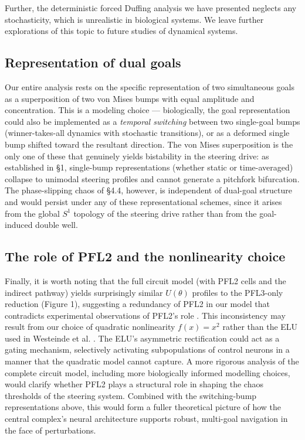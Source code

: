 \documentclass[11pt]{article}
\begin{document}
Further, the deterministic forced Duffing analysis we have presented neglects any stochasticity, which is unrealistic in biological systems. We leave further explorations of this topic to future studies of dynamical systems.

\subsection{Representation of dual goals}

Our entire analysis rests on the specific representation of two simultaneous goals as a superposition of two von Mises bumps with equal amplitude and concentration. This is a modeling choice --- biologically, the goal representation could also be implemented as a \textit{temporal switching} between two single-goal bumps (winner-takes-all dynamics with stochastic transitions), or as a deformed single bump shifted toward the resultant direction. The von Mises superposition is the only one of these that genuinely yields bistability in the steering drive: as established in §1, single-bump representations (whether static or time-averaged) collapse to unimodal steering profiles and cannot generate a pitchfork bifurcation. The phase-slipping chaos of §4.4, however, is independent of dual-goal structure and would persist under any of these representational schemes, since it arises from the global $S^1$ topology of the steering drive rather than from the goal-induced double well.

\subsection{The role of PFL2 and the nonlinearity choice}

Finally, it is worth noting that the full circuit model (with PFL2 cells and the indirect pathway) yields surprisingly similar $U(\theta)$ profiles to the PFL3-only reduction (Figure 1), suggesting a redundancy of PFL2 in our model that contradicts experimental observations of PFL2's role \cite{westeinde2024}. This inconsistency may result from our choice of quadratic nonlinearity $f(x) = x^2$ rather than the ELU used in Westeinde et al. \cite{westeinde2024}. The ELU's asymmetric rectification could act as a gating mechanism, selectively activating subpopulations of control neurons in a manner that the quadratic model cannot capture. A more rigorous analysis of the complete circuit model, including more biologically informed modelling choices, would clarify whether PFL2 plays a structural role in shaping the chaos thresholds of the steering system. Combined with the switching-bump representations above, this would form a fuller theoretical picture of how the central complex's neural architecture supports robust, multi-goal navigation in the face of perturbations.
\end{document}
